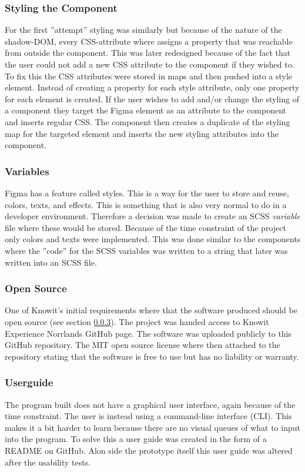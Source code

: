 \subsubsection{Styling the Component}%
\label{ssub:Styling the component}
For the first ''attempt'' styling was similarly but because of the nature of the shadow-DOM, every CSS-attribute where assigns a property that was reachable from outside the component. This was later redesigned because of the fact that the user could not add a new CSS attribute to the component if they wished to. To fix this the CSS attributes were stored in maps \cite{ArrayPrototypeMap} and then pushed into a style element. Instead of creating a property for each style attribute, only one property for each element is created. If the user wishes to add and/or change the styling of a component they target the Figma element as an attribute to the component and inserts regular CSS. The component then creates a duplicate of the styling map for the targeted element and inserts the new styling attributes into the component.


\subsubsection{Variables}%
\label{ssub:Variables}
Figma has a feature called styles. This is a way for the user to store and reuse, colors, texts, and effects. This is something that is also very normal to do in a developer environment. Therefore a decision was made to create an SCSS \textit{variable} file where these would be stored. Because of the time constraint of the project only colors and texts were implemented. This was done similar to the components where the ''code'' for the SCSS variables was written to a string that later was written into an SCSS file. 

\subsubsection{Open Source}%
\label{ssub:Open Source}
One of Knowit's initial requirements where that the software produced should be open source (see section \ref{ssub:Open Source}). The project was handed access to Knowit Experience Norrlands GitHub page. The software was uploaded publicly to this GitHub repository. The MIT\cite{MITLicenseOpen} open source license where then attached to the repository stating that the software is free to use but has no liability or warranty.
 
\subsubsection{Userguide}%
\label{ssub:Userguide}
The program built does not have a graphical user interface, again because of the time constraint. The user is instead using a command-line interface (CLI). This makes it a bit harder to learn because there are no visual queues of what to input into the program. To solve this a user guide was created in the form of a README on GitHub\cite{BuildSoftwareBetter}. Alon side the prototype itself this user guide was altered after the usability tests.

